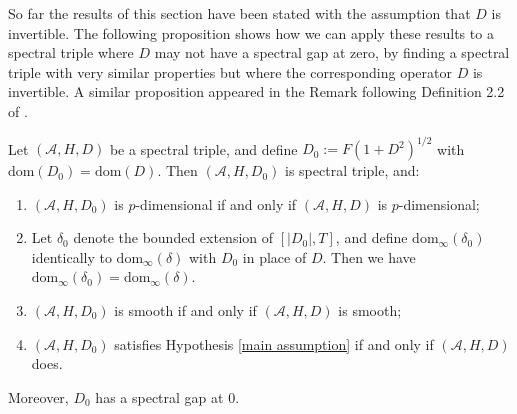     So far the results of this section have been stated with the assumption that $D$ is invertible. The following proposition shows how we can apply these results to a spectral triple
    where $D$ may not have a spectral gap at zero, by finding a spectral triple with very similar properties but where the corresponding operator $D$ is invertible.
    A similar proposition appeared in the Remark following Definition 2.2 of \cite{CPRS2}. 
    \begin{prop}\label{pass to spectral gap 1} 
        Let $(\mathcal{A},H,D)$ be a spectral triple, and define $D_0 := F(1+D^2)^{1/2}$ with $\mathrm{dom}(D_0) = \mathrm{dom}(D)$. Then $(\mathcal{A},H,D_0)$ is spectral triple, and:
        \begin{enumerate}[{\rm (i)}]
            \item{}\label{iff p dim} $(\mathcal{A},H,D_0)$ is $p$-dimensional if and only if $(\mathcal{A},H,D)$ is $p$-dimensional;
            \item{}\label{iff dom} Let $\delta_0$ denote the bounded extension of $[|D_0|,T]$, and define $\mathrm{dom}_\infty(\delta_0)$ identically to $\mathrm{dom}_\infty(\delta)$ with $D_0$ in place of $D$. Then we have $\mathrm{dom}_\infty(\delta_0) = \mathrm{dom}_\infty(\delta)$.
            \item{}\label{iff smooth} $(\mathcal{A},H,D_0)$ is smooth if and only if $(\mathcal{A},H,D)$ is smooth;
            \item{}\label{iff main assumption} $(\mathcal{A},H,D_0)$ satisfies Hypothesis \ref{main assumption} if and only if $(\mathcal{A},H,D)$ does.
        \end{enumerate}
        Moreover, $D_0$ has a spectral gap at $0$.
    \end{prop}
